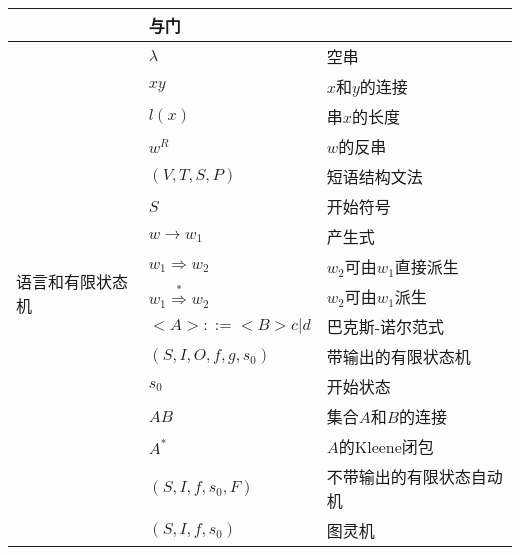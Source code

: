 \documentclass[UTF8]{ctexart}
\begin{document}
\begin{longtable}{|p{9em}|p{15em}|p{15em}|}
    & 与门\\
    \hline
    \multirow{16}{9em}{语言和有限状态机} & $\lambda$ & 空串\\
    \cline{2-3}
      & $xy$& $x$和$y$的连接\\
    \cline{2-3}
      & $l(x)$& 串$x$的长度\\
    \cline{2-3}
      & $w^R$& $w$的反串\\
    \cline{2-3}
      & $(V,T,S,P)$& 短语结构文法\\
    \cline{2-3}
      & $S$& 开始符号\\
    \cline{2-3}
      & $w\rightarrow w_1$& 产生式\\
    \cline{2-3}
      & $w_1\Rightarrow w_2$& $w_2$可由$w_1$直接派生\\
    \cline{2-3}
      & $w_1\stackrel{*}{\Rightarrow}w_2$& $w_2$可由$w_1$派生\\
    \cline{2-3}
      & $<A>::=<B>c|d$& 巴克斯-诺尔范式\\
    \cline{2-3}
      & $(S,I,O,f,g,s_0)$& 带输出的有限状态机\\
    \cline{2-3}
      & $s_0$& 开始状态\\
    \cline{2-3}
      & $AB$& 集合$A$和$B$的连接\\
    \cline{2-3}
      & $A^*$& $A$的Kleene闭包\\
    \cline{2-3}
      & $(S,I,f,s_0,F)$& 不带输出的有限状态自动机\\
    \cline{2-3}
      & $(S,I,f,s_0)$& 图灵机\\
  \toprule
\end{longtable}
\end{document}
